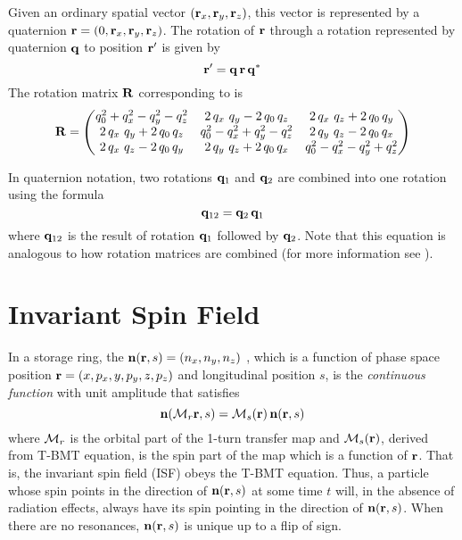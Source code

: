 Given an ordinary spatial vector $({\bf r}_x, {\bf r}_y, {\bf r}_z)$, this vector is represented by a
quaternion ${\bf r} = (0, {\bf r}_x, {\bf r}_y, {\bf r}_z)$. The rotation of ${\bf r}$ through a rotation
represented by quaternion ${\bf q}$ to position ${\bf r}'$ is given by
\begin{equation}
  {\bf r}' = {\bf q} \, {\bf r} \, {\bf q}^*
  \label{rqrq}
\end{equation}
The rotation matrix ${\bf R}$ corresponding to  is
\begin{equation}
  {\bf R} = \begin{pmatrix}
    q_0^2 + q_x^2 - q_y^2 - q_z^2    & 2 \, q_x \ q_y - 2 \, q_0 \, q_z & 2 \, q_x \ q_z + 2 \, q_0 \, q_y \\
    2 \, q_x \ q_y + 2 \, q_0 \, q_z & q_0^2 - q_x^2 + q_y^2 - q_z^2    & 2 \, q_y \ q_z - 2 \, q_0 \, q_x \\
    2 \, q_x \ q_z - 2 \, q_0 \, q_y & 2 \, q_y \ q_z + 2 \, q_0 \, q_x & q_0^2 - q_x^2 - q_y^2 + q_z^2 
  \end{pmatrix}
  \label{rqqq}
\end{equation}

In quaternion notation, two rotations ${\bf q}_1$ and ${\bf q}_2$ are combined into one rotation using the formula
\begin{equation}
  {\bf q}_{12} = {\bf q}_2 \, {\bf q}_1
\end{equation}
where ${\bf q}_{12}$ is the result of rotation ${\bf q}_1$ followed by ${\bf q}_2$. Note that this equation
is analogous to how rotation matrices are combined (for more information see \cite{b:quat}).

\section{Invariant Spin Field}
\label{s:isf}

In a storage ring, the  ${\bf n}({\bf r}, s) = (n_x, n_y, n_z)$
\cite{b:spin.hoff,b:duan15}, which is a function of phase space position ${\bf r} = (x, p_x, y, p_y, z,
p_z)$ and longitudinal position $s$, is the {\em continuous function} with unit amplitude that
satisfies
\begin{equation}
  {\bf n}({\cal M}_r {\bf r}, s) = {\cal M}_s({\bf r}) \, {\bf n}({\bf r}, s)
  \label{nmrs}
\end{equation}
where ${\cal M}_r$ is the orbital part of the 1-turn transfer map and ${\cal M}_s({\bf r})$, derived from
T-BMT equation, is the spin part of the map which is a function of ${\bf r}$. That is, the invariant
spin field (ISF) obeys the T-BMT equation. Thus, a particle whose spin points in the direction of
${\bf n}({\bf r}, s)$ at some time $t$ will, in the absence of radiation effects, always have its spin
pointing in the direction of ${\bf n}({\bf r}, s)$. When there are no resonances, ${\bf n}({\bf r}, s)$ is
unique up to a flip of sign.

